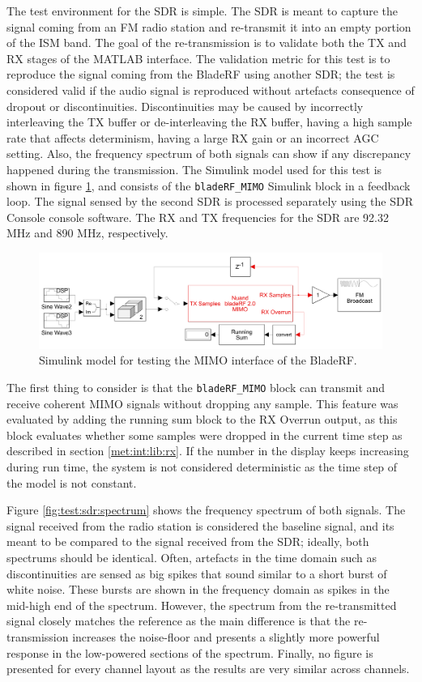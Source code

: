 \documentclass[12pt,a4paper]{report}
\begin{document}
The test environment for the SDR is simple. The SDR is meant to capture the signal coming from an FM radio station and re-transmit it into an empty portion of the ISM band. The goal of the re-transmission is to validate both the TX and RX stages of the MATLAB interface. The validation metric for this test is to reproduce the signal coming from the BladeRF using another SDR; the test is considered valid if the audio signal is reproduced without artefacts consequence of dropout or discontinuities. Discontinuities may be caused by incorrectly interleaving the TX buffer or de-interleaving the RX buffer, having a high sample rate that affects determinism, having a large RX gain or an incorrect AGC setting. Also, the frequency spectrum of both signals can show if any discrepancy happened during the transmission. The Simulink model used for this test is shown in figure \ref{fig:test:sdr}, and consists of the \verb|bladeRF_MIMO| Simulink block in a feedback loop. The signal sensed by the second SDR is processed separately using the SDR Console console software. The RX and TX frequencies for the SDR are 92.32 MHz and 890 MHz, respectively.

\begin{figure}[h]
    \centering
    \includegraphics[width = \textwidth]{Figures/test_sdr.png}
    \caption{Simulink model for testing the MIMO interface of the BladeRF.}
    \label{fig:test:sdr}
\end{figure}

The first thing to consider is that the \verb|bladeRF_MIMO| block can transmit and receive coherent MIMO signals without dropping any sample. This feature was evaluated by adding the running sum block to the RX Overrun output, as this block evaluates whether some samples were dropped in the current time step as described in section \ref{met:int:lib:rx}. If the number in the display keeps increasing during run time, the system is not considered deterministic as the time step of the model is not constant. 

Figure \ref{fig:test:sdr:spectrum} shows the frequency spectrum of both signals. The signal received from the radio station is considered the baseline signal, and its meant to be compared to the signal received from the SDR; ideally, both spectrums should be identical. Often, artefacts in the time domain such as discontinuities are sensed as big spikes that sound similar to a short burst of white noise. These bursts are shown in the frequency domain as spikes in the mid-high end of the spectrum. However, the spectrum from the re-transmitted signal closely matches the reference as the main difference is that the re-transmission increases the noise-floor and presents a slightly more powerful response in the low-powered sections of the spectrum. Finally, no figure is presented for every channel layout as the results are very similar across channels.
\end{document}
